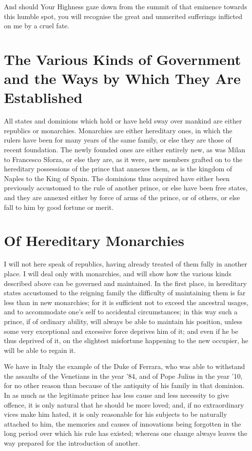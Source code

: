 \documentclass[12pt,letterpaper]{memoir}
\begin{document}
And should Your Highness gaze down from the summit of that eminence
towards this humble spot, you will recognise the great and unmerited
sufferings inflicted on me by a cruel fate.

\chapter{The Various Kinds of Government and the Ways by Which They Are Established}

All states and dominions which hold or have held sway over mankind are
either republics or monarchies. Monarchies are either hereditary ones,
in which the rulers have been for many years of the same family, or
else they are those of recent foundation. The newly founded ones are
either entirely new, as was Milan to Francesco Sforza, or else they
are, as it were, new members grafted on to the hereditary possessions
of the prince that annexes them, as is the kingdom of Naples to the
King of Spain. The dominions thus acquired have either been previously
accustomed to the rule of another prince, or else have been free
states, and they are annexed either by force of arms of the prince, or
of others, or else fall to him by good fortune or merit.

\chapter{Of Hereditary Monarchies}

I will not here speak of republics, having already treated of them
fully in another place. I will deal only with monarchies, and will show
how the various kinds described above can be governed and maintained.
In the first place, in hereditary states accustomed to the reigning
family the difficulty of maintaining them is far less than in new
monarchies; for it is sufficient not to exceed the ancestral usages,
and to accommodate one's self to accidental circumstances; in this way
such a prince, if of ordinary ability, will always be able to maintain
his position, unless some very exceptional and excessive force deprives
him of it; and even if he be thus deprived of it, on the slightest
misfortune happening to the new occupier, he will be able to regain it.

We have in Italy the example of the Duke of Ferrara, who was able
to withstand the assaults of the Venetians in the year '84, and of
Pope Julius in the year '10, for no other reason than because of the
antiquity of his family in that dominion. In as much as the legitimate
prince has less cause and less necessity to give offence, it is only
natural that he should be more loved; and, if no extraordinary vices
make him hated, it is only reasonable for his subjects to be naturally
attached to him, the memories and causes of innovations being forgotten
in the long period over which his rule has existed; whereas one change
always leaves the way prepared for the introduction of another.
\end{document}
